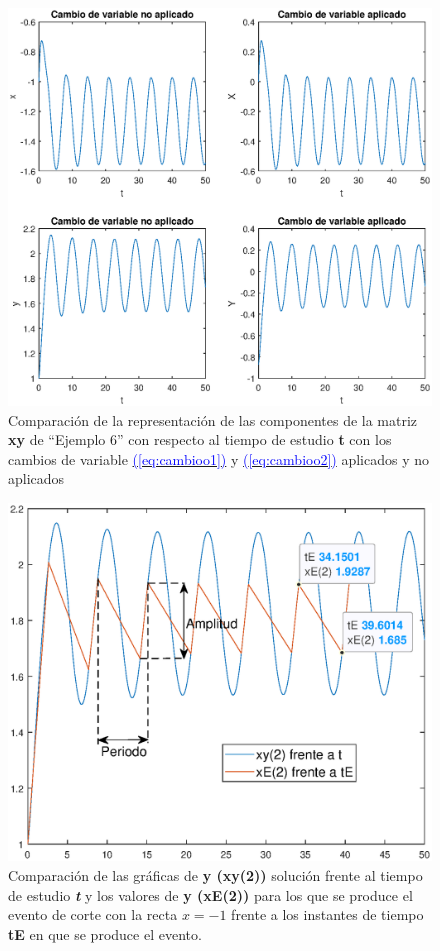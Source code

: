 \documentclass[12pt,a4paper]{report} %
\newcommand{\eref}[1]{\hyperref[#1]{\textcolor{blue}{(\ref*{#1})}}}
\newcommand{\eref}[1]{\hyperref[#1]{\textcolor{blue}{\textit{(\ref*{#1})}}}}
\begin{document}
    \begin{figure}[h]
    	\centering
    	\includegraphics[width=1.2\textwidth,center]{g2ejem6tiempo.eps}
    	\caption{Comparación de la representación de las componentes de la matriz \textbf{xy} de ``Ejemplo 6'' con respecto al tiempo de estudio \textbf{t} con los cambios de variable \eref{eq:cambioo1} y \eref{eq:cambioo2} aplicados y no aplicados}
    	\label{fig:g2ejem6}
    \end{figure}\smallskip
	
	\newpage
	
	\begin{figure}[h]
		\centering
		\includegraphics[width=1.1\textwidth,center]{g3ejem6tiempo.eps}
		\caption{Comparación de las gráficas de \textbf{y (xy(2))} solución frente al tiempo de estudio \textit{\textbf{t}} y los valores de \textbf{y (xE(2))} para los que se produce el evento de corte con la recta $x=-1$ frente a los instantes de tiempo \textbf{tE} en que se produce el evento.}
		\label{fig:g3ejem6}
	\end{figure}\smallskip
	
\end{document}
